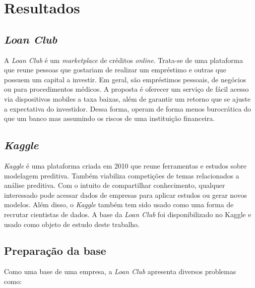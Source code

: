 
\chapter{Resultados}

\section{\emph{Loan Club}}

A \emph{Loan Club} é um \emph{marketplace} de créditos \emph{online}. Trata-se de uma plataforma que reune pessoas que gostariam de realizar um empréstimo e outras que possuem um capital a investir. Em geral, são empréstimos pessoais, de negócios ou para procedimentos médicos. A proposta é oferecer um serviço de fácil acesso via dispositivos mobiles a taxa baixas, além de garantir um retorno que se ajuste a expectativa do investidor. Dessa forma, operam de forma menos burocrática do que um banco mas assumindo os riscos de uma instituição financeira.

\section{\emph{Kaggle}}

\emph{Kaggle} é uma plataforma criada em 2010 que reune ferramentas e estudos sobre modelagem preditiva. Também viabiliza competições de temas relacionados a análise preditiva. Com o intuito de compartilhar conhecimento, qualquer interessado pode acessar dados de empresas para aplicar estudos ou gerar novos modelos. Além disso, o \emph{Kaggle} também tem sido usado como uma forma de recrutar cientistas de dados. A base da \emph{Loan Club} foi disponibilizado no Kaggle e usado como objeto de estudo deste trabalho.

\section{Preparação da base}

Como uma base de uma empresa, a \emph{Loan Club} apresenta diversos problemas como:

